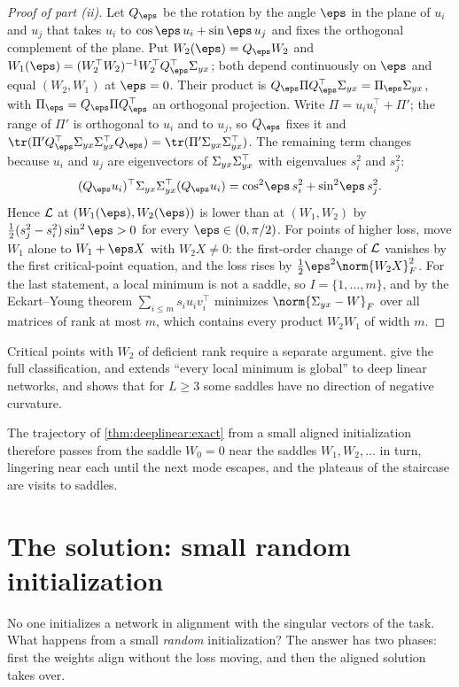 \begin{refsection}
\begin{proof}[Proof of part (ii)]
Let $Q_\eps$ be the rotation by the angle $\eps$ in the plane of $u_i$ and $u_j$ that takes $u_i$ to $\cos\eps\,u_i+\sin\eps\,u_j$ and fixes the orthogonal complement of the plane. Put $W_2(\eps)=Q_\eps W_2$ and $W_1(\eps)=(W_2^\top W_2)^{-1}W_2^\top Q_\eps^\top\dlS$; both depend continuously on $\eps$ and equal $(W_2,W_1)$ at $\eps=0$. Their product is $Q_\eps\Pi Q_\eps^\top\dlS=\Pi_\eps\dlS$, with $\Pi_\eps=Q_\eps\Pi Q_\eps^\top$ an orthogonal projection. Write $\Pi=u_iu_i^\top+\Pi'$; the range of $\Pi'$ is orthogonal to $u_i$ and to $u_j$, so $Q_\eps$ fixes it and $\tr(\Pi'Q_\eps^\top\dlS\dlS^\top Q_\eps)=\tr(\Pi'\dlS\dlS^\top)$. The remaining term changes because $u_i$ and $u_j$ are eigenvectors of $\Sigma_{yx}\Sigma_{yx}^\top$ with eigenvalues $s_i^2$ and $s_j^2$:
\[
  (Q_\eps u_i)^\top\dlS\dlS^\top(Q_\eps u_i)=\cos^2\!\eps\,s_i^2+\sin^2\!\eps\,s_j^2 .
\]
Hence $\mathcal{L}$ at $(W_1(\eps),W_2(\eps))$ is lower than at $(W_1,W_2)$ by $\frac12(s_j^2-s_i^2)\sin^2\eps>0$ for every $\eps\in(0,\pi/2)$. For points of higher loss, move $W_1$ alone to $W_1+\eps X$ with $W_2X\ne0$: the first-order change of $\mathcal{L}$ vanishes by the first critical-point equation, and the loss rises by $\frac12\eps^2\norm{W_2X}_F^2$. For the last statement, a local minimum is not a saddle, so $I=\{1,\dots,m\}$, and by the Eckart--Young theorem $\sum_{i\le m}s_iu_iv_i^\top$ minimizes $\norm{\dlS-W}_F$ over all matrices of rank at most $m$, which contains every product $W_2W_1$ of width $m$.
\end{proof}

Critical points with $W_2$ of deficient rank require a separate argument. \Textcite{BaldiHornik1989} give the full classification, and \textcite{Kawaguchi2016} extends ``every local minimum is global'' to deep linear networks, and shows that for $L\ge3$ some saddles have no direction of negative curvature.

The trajectory of \cref{thm:deeplinear:exact} from a small aligned initialization therefore passes from the saddle $W_0=0$ near the saddles $W_1,W_2,\dots$ in turn, lingering near each until the next mode escapes, and the plateaus of the staircase are visits to saddles.

\section{The solution: small random initialization}\label{sec:deeplinear:random}

No one initializes a network in alignment with the singular vectors of the task. What happens from a small \emph{random} initialization? The answer has two phases: first the weights align without the loss moving, and then the aligned solution takes over.


\end{refsection}
